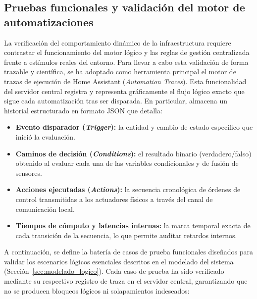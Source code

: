 \subsection{Pruebas funcionales y validación del motor de automatizaciones}
\label{sec:pruebas_funcionales}

La verificación del comportamiento dinámico de la infraestructura requiere contrastar el funcionamiento del motor lógico y las reglas de gestión centralizada frente a estímulos reales del entorno. Para llevar a cabo esta validación de forma trazable y científica, se ha adoptado como herramienta principal el motor de trazas de ejecución de Home Assistant (\textit{Automation Traces}). Esta funcionalidad del servidor central registra y representa gráficamente el flujo lógico exacto que sigue cada automatización tras ser disparada. En particular, almacena un historial estructurado en formato JSON que detalla:

\begin{itemize}
    \item \textbf{Evento disparador (\textit{Trigger}):} la entidad y cambio de estado específico que inició la evaluación.
    \item \textbf{Caminos de decisión (\textit{Conditions}):} el resultado binario (verdadero/falso) obtenido al evaluar cada una de las variables condicionales y de fusión de sensores.
    \item \textbf{Acciones ejecutadas (\textit{Actions}):} la secuencia cronológica de órdenes de control transmitidas a los actuadores físicos a través del canal de comunicación local.
    \item \textbf{Tiempos de cómputo y latencias internas:} la marca temporal exacta de cada transición de la secuencia, lo que permite auditar retardos internos.
\end{itemize}

A continuación, se define la batería de casos de prueba funcionales diseñados para validar los escenarios lógicos esenciales descritos en el modelado del sistema (Sección~\ref{sec:modelado_logico}). Cada caso de prueba ha sido verificado mediante su respectivo registro de traza en el servidor central, garantizando que no se producen bloqueos lógicos ni solapamientos indeseados:

